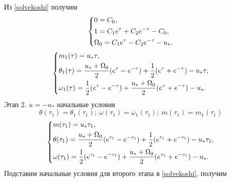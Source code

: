 \documentclass[a4paper,14pt]{article}
\theoremstyle{plain} %
\theoremstyle{definition} %
\theoremstyle{remark} %
\begin{document}
{Из \eqref{solvekoshi} получим
\begin{equation}\label{stage11}
    \left\{ {\begin{aligned}
                 & 0 = C_0, \hfill                                 \\
                 & 1 = C_1e^\tau+C_2e^{-\tau}-C_0 , \hfill         \\
                 & \Omega_0 = C_1e^\tau-C_2e^{-\tau}-u_*  . \hfill \\
            \end{aligned}} \right.
\end{equation}
\begin{equation}\label{solvefull1stage}
    \left\{ {\begin{aligned}
                 & m_1(\tau) = u_*\tau, \hfill                                                                              \\
                 & \theta_1(\tau) = \frac{u_*+\Omega_0}{2}(e^\tau-e^{-\tau})+\frac{1}{2}(e^\tau+e^{-\tau})-u_*\tau , \hfill \\
                 & \omega_1(\tau) = \frac{1}{2}(e^\tau-e^{-\tau})+\frac{u_*+\Omega_0}{2}(e^\tau+e^{-\tau})-u_*  . \hfill    \\
            \end{aligned}} \right.
\end{equation}
Этап 2. $u=-u_*$ начальные условия
\[
    \theta(\tau_1)=\theta_1(\tau_1);\ \omega(\tau_1)=\omega_1(\tau_1);\ m(\tau_1)=m_1(\tau_1)
\]
\begin{equation}\label{basecond2stage}
    \left\{ {\begin{aligned}
                 & m(\tau_1) = u_*\tau_1, \hfill                                                                                          \\
                 & \theta(\tau_1) = \frac{u_*+\Omega_0}{2}(e^{\tau_1}-e^{-\tau_1})+\frac{1}{2}(e^{\tau_1}+e^{-\tau_1})-u_*\tau_1 , \hfill \\
                 & \omega(\tau_1) = \frac{1}{2}(e^{\tau_1}-e^{-\tau_1})+\frac{u_*+\Omega_0}{2}(e^{\tau_1}+e^{-\tau_1})-u_*  . \hfill      \\
            \end{aligned}} \right.
\end{equation}
Подставим начальные условия для второго этапа в \eqref{solvekoshi}, получим

}
\end{document}
